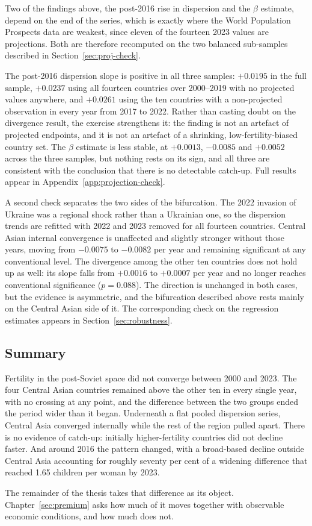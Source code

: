 Two of the findings above, the post-2016 rise in dispersion and the $\beta$ estimate, depend on the end of the series, which is exactly where the World Population Prospects data are weakest, since eleven of the fourteen 2023 values are projections. Both are therefore recomputed on the two balanced sub-samples described in Section~\ref{sec:proj-check}.

The post-2016 dispersion slope is positive in all three samples: $+0.0195$ in the full sample, $+0.0237$ using all fourteen countries over 2000--2019 with no projected values anywhere, and $+0.0261$ using the ten countries with a non-projected observation in every year from 2017 to 2022. Rather than casting doubt on the divergence result, the exercise strengthens it: the finding is not an artefact of projected endpoints, and it is not an artefact of a shrinking, low-fertility-biased country set. The $\beta$ estimate is less stable, at $+0.0013$, $-0.0085$ and $+0.0052$ across the three samples, but nothing rests on its sign, and all three are consistent with the conclusion that there is no detectable catch-up. Full results appear in Appendix~\ref{app:projection-check}.

A second check separates the two sides of the bifurcation. The 2022 invasion of Ukraine was a regional shock rather than a Ukrainian one, so the dispersion trends are refitted with 2022 and 2023 removed for all fourteen countries. Central Asian internal convergence is unaffected and slightly stronger without those years, moving from $-0.0075$ to $-0.0082$ per year and remaining significant at any conventional level. The divergence among the other ten countries does not hold up as well: its slope falls from $+0.0016$ to $+0.0007$ per year and no longer reaches conventional significance ($p = 0.088$). The direction is unchanged in both cases, but the evidence is asymmetric, and the bifurcation described above rests mainly on the Central Asian side of it. The corresponding check on the regression estimates appears in Section~\ref{sec:robustness}.

\subsection{Summary}
\label{sec:trends-summary}

Fertility in the post-Soviet space did not converge between 2000 and 2023. The four Central Asian countries remained above the other ten in every single year, with no crossing at any point, and the difference between the two groups ended the period wider than it began. Underneath a flat pooled dispersion series, Central Asia converged internally while the rest of the region pulled apart. There is no evidence of catch-up: initially higher-fertility countries did not decline faster. And around 2016 the pattern changed, with a broad-based decline outside Central Asia accounting for roughly seventy per cent of a widening difference that reached 1.65 children per woman by 2023.

The remainder of the thesis takes that difference as its object. Chapter~\ref{sec:premium} asks how much of it moves together with observable economic conditions, and how much does not.
